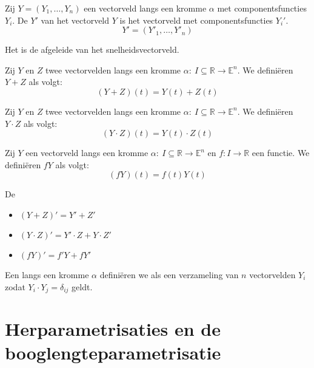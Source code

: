 \documentclass[main.tex]{subfiles}
\begin{document}
\begin{de}
  Zij $Y = (Y_{1},\dotsc,Y_{n})$ een vectorveld langs een kromme $\alpha$ met componentsfuncties $Y_{i}$.
  De  $Y'$ van het vectorveld $Y$ is het vectorveld met componentsfuncties $Y_{i}'$.
  \[ Y' = (Y'_{1},\dotsc,Y'_{n}) \]
\end{de}

\begin{de}
  Het  is de afgeleide van het snelheidsvectorveld.
\end{de}

\begin{de}
  Zij $Y$ en $Z$ twee vectorvelden langs een kromme $\alpha:\ I \subseteq \mathbb{R}\rightarrow \mathbb{E}^{n}$.
  We defini\"eren $Y+Z$ als volgt:
  \[ (Y + Z)(t) = Y(t) + Z(t)\]
\end{de}

\begin{de}
  Zij $Y$ en $Z$ twee vectorvelden langs een kromme $\alpha:\ I \subseteq \mathbb{R}\rightarrow \mathbb{E}^{n}$.
  We defini\"eren $Y\cdot Z$ als volgt:
  \[ (Y \cdot Z)(t) = Y(t) \cdot Z(t)\]
\end{de}

\begin{de}
  Zij $Y$ een vectorveld langs een kromme $\alpha:\ I \subseteq \mathbb{R}\rightarrow \mathbb{E}^{n}$ en $f: I \rightarrow \mathbb{R}$ een functie.
  We defini\"eren $fY$ als volgt:
  \[ (fY)(t) = f(t)Y(t)\]
\end{de}

\begin{st}
  De \\
  \begin{itemize}
  \item $(Y+Z)' = Y' + Z'$
  \item $(Y \cdot Z)' = Y'\cdot Z + Y \cdot Z'$
  \item $(fY)' = f'Y + fY'$
  \end{itemize}
\end{st}

\begin{de}
  Een  langs een kromme $\alpha$ defini\"eren we als een verzameling van $n$ vectorvelden $Y_{i}$ zodat $Y_{i}\cdot Y_{j} = \delta_{ij}$ geldt.
\end{de}

\section{Herparametrisaties en de booglengteparametrisatie}
\label{sec:herp-en-de}
\end{document}
